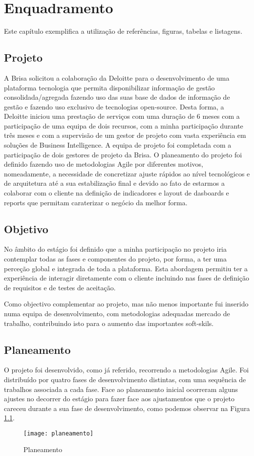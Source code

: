 \chapter{Enquadramento}
\label{cap2}

Este capítulo exemplifica a utilização de referências, figuras, tabelas e listagens.

\section{Projeto}
\par A Brisa solicitou a colaboração da Deloitte para o desenvolvimento de uma plataforma tecnologia que permita disponibilizar informação de gestão consolidada/agregada fazendo uso das suas base de dados de informação de gestão e fazendo uso exclusivo de tecnologias open-source. Desta forma, a Deloitte iniciou uma prestação de serviços com uma duração de 6 meses com a participação de uma equipa de dois recursos, com a minha participação durante três meses e com a supervisão de um gestor de projeto com vasta experiência em soluções de Business Intelligence. A equipa de projeto foi completada com a participação de dois gestores de projeto da Brisa. O planeamento do projeto foi definido fazendo uso de metodologias Agile por diferentes motivos, nomeadamente, a necessidade de concretizar ajuste rápidos ao nível tecnológicos e de arquitetura até a sua estabilização final e devido ao fato de estarmos a colaborar com o cliente na definição de indicadores e layout de dasboards e reports que permitam caraterizar o negócio da melhor forma.
\section{Objetivo}
\par No âmbito do estágio foi definido que a minha participação no projeto iria contemplar todas as fases e componentes do projeto, por forma, a ter uma perceção global e integrada de toda a plataforma. Esta abordagem permitiu ter a experiência de interagir diretamente com o cliente incluindo nas fases de definição de requisitos e de testes de aceitação. 
\par Como objectivo complementar ao projeto, mas não menos importante fui inserido numa equipa de desenvolvimento, com metodologias adequadas mercado de trabalho, contribuindo isto para o aumento das importantes soft-skils.
\section{Planeamento}
\par O projeto foi desenvolvido, como já referido, recorrendo a metodologias Agile. Foi distribuído por quatro fases de desenvolvimento distintas, com uma sequência de trabalhos associada a cada fase. Face ao planeamento inicial ocorreram alguns ajustes no decorrer do estágio para fazer face aos ajustamentos que o projeto careceu durante a sua fase de desenvolvimento, como podemos observar na Figura  \ref{fig:planeamentoFig}. 
\begin{figure}[!htb]
\centering
\texttt{[image: planeamento]}
\caption{Planeamento}
\label{fig:planeamentoFig}
\end{figure}